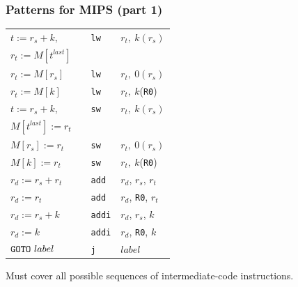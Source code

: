 \documentclass{beamer}
\begin{document}
\begin{frame}
\frametitle{Patterns for MIPS (part 1)}

\renewcommand{\arraystretch}{0.9}
\begin{tabular}{|l|lll|}\hline

$ t := r_s + k,$
&&  {\tt lw} & $r_t,~k(r_s)$ \\
$r_t := M[t^{last}]$ &&& \\\hline

$ r_t := M[r_s]$
&&  {\tt lw} & $r_t,~0(r_s)$ \\\hline

$ r_t := M[k]$
&&  {\tt lw} & $r_t,~k$({\tt R0}) \\\hline

$ t := r_s + k,$
&&  {\tt sw} & $r_t,~k(r_s)$ \\
$M[t^{last}] := r_t$ &&&  \\\hline

$ M[r_s] := r_t$
&&  {\tt sw} & $r_t,~0(r_s)$ \\\hline

$ M[k] := r_t$
&&  {\tt sw} & $r_t,~k$({\tt R0}) \\\hline

$  r_d := r_s + r_t  $
&&  {\tt add} & $r_d$, $r_s$, $r_t$ \\\hline

$  r_d := r_t  $
&&  {\tt add} & $r_d$, {\tt R0}, $r_t$ \\\hline

$  r_d := r_s + k  $
&&  {\tt addi} & $r_d$, $r_s$, $k$ \\\hline

$  r_d := k  $
&& {\tt addi} & $r_d$, {\tt R0}, $k$ \\\hline

$  {\tt GOTO}~label  $ 
&& {\tt j} & $label$ \\\hline

\end{tabular}

\bigskip

Must cover all possible sequences of intermediate-code instructions.

\end{frame}
\end{document}
